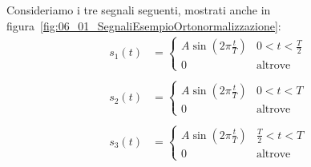 Consideriamo i tre segnali seguenti, mostrati anche in
figura~\ref{fig:06_01_SegnaliEsempioOrtonormalizzazione}:
\[
    \begin{aligned}
        s_{1}(t) &= \begin{cases}
            A \sin \left( 2\pi \frac{t}{T} \right) & 0 < t < \frac{T}{2} \\ 
            0 & \text{altrove}
        \end{cases} \\ \\ 
        s_{2}(t) &= \begin{cases}
            A \sin \left( 2\pi \frac{t}{T} \right) & 0 < t < T \\ 
            0 & \text{altrove}
        \end{cases} \\ \\ 
        s_{3}(t) &= \begin{cases}
            A \sin \left( 2\pi \frac{t}{T} \right) & \frac{T}{2} < t < T \\ 
            0 & \text{altrove}
        \end{cases}
    \end{aligned}
\]

